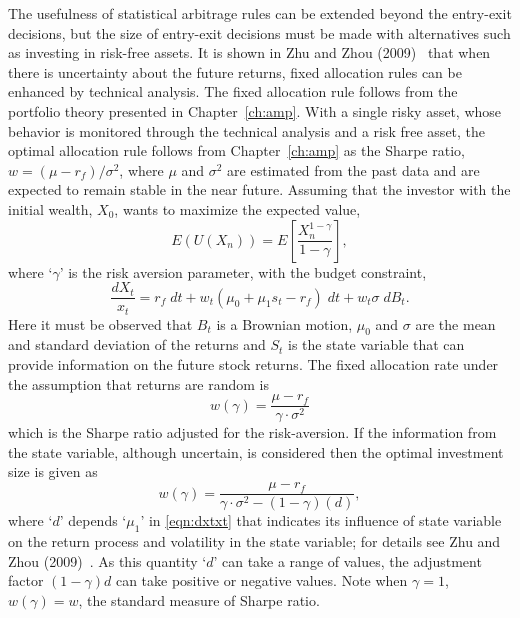 The usefulness of statistical arbitrage rules can be extended beyond the entry-exit decisions, but the size of entry-exit decisions must be made with alternatives such as investing in risk-free assets. It is shown in Zhu and Zhou (2009)~\cite{zhuzhou09} that when there is uncertainty about the future returns, fixed allocation rules can be enhanced by technical analysis. The fixed allocation rule follows from the portfolio theory presented in Chapter~\ref{ch:amp}. With a single risky asset, whose behavior is monitored through the technical analysis and a risk free asset, the optimal allocation rule follows from Chapter~\ref{ch:amp} as the Sharpe ratio, $w= (\mu - r_f)/\sigma^2$, where $\mu$ and $\sigma^2$ are estimated from the past data and are expected to remain stable in the near future. Assuming that the investor with the initial wealth, $X_0$, wants to maximize the expected value,
	\begin{equation} \label{eqn:euxn}
	E(U(X_n))= E \left[ \dfrac{X_n^{1-\gamma}}{1 - \gamma}\right],
	\end{equation}
where `$\gamma$' is the risk aversion parameter, with the budget constraint,
	\begin{equation} \label{eqn:dxtxt}
	\dfrac{dX_t}{x_t}= r_f \; dt + w_t (\mu_0 + \mu_1 s_t - r_f) \; dt + w_t \sigma \; dB_t.
	\end{equation}
Here it must be observed that $B_t$ is a Brownian motion, $\mu_0$ and $\sigma$ are the mean and standard deviation of the returns and $S_t$ is the state variable that can provide information on the future stock returns. The fixed allocation rate under the assumption that returns are random is
	\begin{equation}\label{eqn:wgamma}
	w(\gamma)= \dfrac{\mu - r_f}{\gamma \cdot \sigma^2}
	\end{equation}
which is the Sharpe ratio adjusted for the risk-aversion. If the information from the state variable, although uncertain, is considered then the optimal investment size is given as
	\begin{equation}\label{eqn:wgamma2}
	w(\gamma)= \dfrac{\mu - r_f}{\gamma \cdot \sigma^2 - (1-\gamma)(d)},
	\end{equation}
where `$d$' depends `$\mu_1$' in \eqref{eqn:dxtxt} that indicates its influence of state variable on the return process and volatility in the state variable; for details see Zhu and Zhou (2009)~\cite{zhuzhou09}. As this quantity `$d$' can take a range of values, the adjustment factor $(1-\gamma)d$ can take positive or negative values. Note when $\gamma=1$, $w(\gamma)=w$, the standard measure of Sharpe ratio. 


